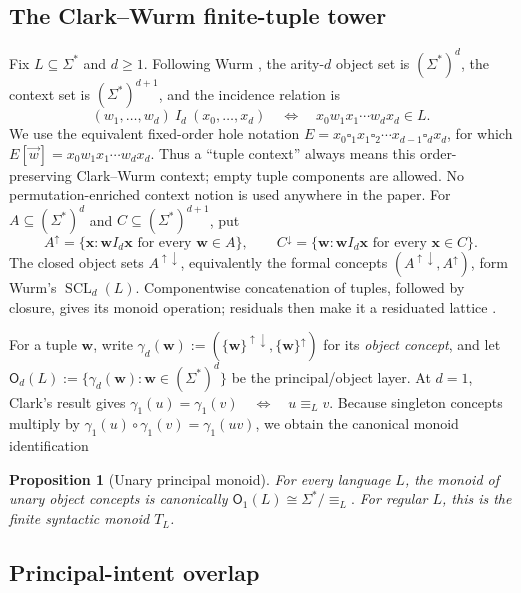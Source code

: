\documentclass[10pt,a4paper]{article}
\newtheorem{proposition}[theorem]{Proposition}
\theoremstyle{definition}
\theoremstyle{remark}
\newcommand{\SCL}{\operatorname{SCL}}
\newcommand{\Obj}{\mathsf O}
\newcommand{\blank}{\square}
\begin{document}
\subsection{The Clark--Wurm finite-tuple tower}

Fix \(L\subseteq\Sigma^*\) and \(d\ge1\).  Following Wurm
\cite{WurmSCLTuples}, the arity-\(d\) object set is \((\Sigma^*)^d\), the
context set is \((\Sigma^*)^{d+1}\), and the incidence relation is
\[
(w_1,\ldots,w_d)\ I_d\ (x_0,\ldots,x_d)
\quad\Longleftrightarrow\quad
x_0w_1x_1\cdots w_dx_d\in L.
\]
We use the equivalent fixed-order hole notation
\(E=x_0\blank_1x_1\blank_2\cdots x_{d-1}\blank_dx_d\), for which
\(E[\vec w]=x_0w_1x_1\cdots w_dx_d\).
Thus a ``tuple context'' always means this order-preserving Clark--Wurm
context; empty tuple components are allowed.  No permutation-enriched context
notion is used anywhere in the paper.
For \(A\subseteq(\Sigma^*)^d\) and \(C\subseteq(\Sigma^*)^{d+1}\), put
\[
A^\uparrow=\{\mathbf x:\mathbf w I_d\mathbf x\text{ for every }\mathbf w\in A\},
\qquad
C^\downarrow=\{\mathbf w:\mathbf w I_d\mathbf x\text{ for every }\mathbf x\in C\}.
\]
The closed object sets \(A^{\uparrow\downarrow}\), equivalently the formal
concepts \((A^{\uparrow\downarrow},A^\uparrow)\), form Wurm's
\(\SCL_d(L)\).  Componentwise concatenation of tuples, followed by closure,
gives its monoid operation; residuals then make it a residuated lattice
\cite{WurmSCLTuples}.

For a tuple \(\mathbf w\), write
\(
 \gamma_d(\mathbf w)
 :=(\{\mathbf w\}^{\uparrow\downarrow},\{\mathbf w\}^\uparrow)
\)
for its \emph{object concept}, and let
\(
 \Obj_d(L):=\{\gamma_d(\mathbf w):\mathbf w\in(\Sigma^*)^d\}
\)
be the principal/object layer.  At \(d=1\), Clark's result
\cite[Proposition~3.19]{ClarkSCL} gives
\(
 \gamma_1(u)=\gamma_1(v)
 \quad\Longleftrightarrow\quad
 u\equiv_L v.
\)
Because singleton concepts multiply by
\(\gamma_1(u)\circ\gamma_1(v)=\gamma_1(uv)\), we obtain the canonical monoid
identification
\begin{proposition}[Unary principal monoid]
\label{scl:prop:unary-principal}
For every language \(L\), the monoid of unary object concepts is canonically
\(
 \Obj_1(L)\cong \Sigma^*/{\equiv_L}.
\)
For regular \(L\), this is the finite syntactic monoid \(T_L\).
\end{proposition}

\subsection{Principal-intent overlap}
\end{document}
